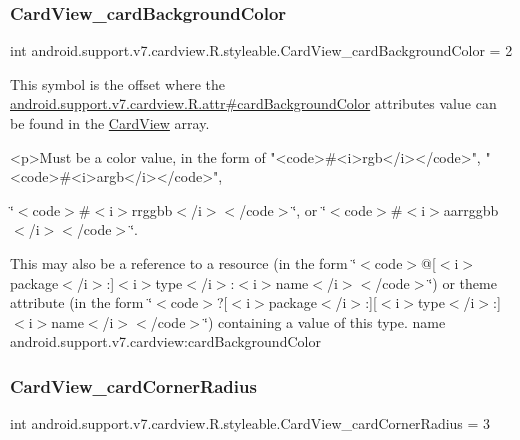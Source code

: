 \subsubsection{\texorpdfstring{Card\+View\+\_\+card\+Background\+Color}{CardView\_cardBackgroundColor}}
{\footnotesize\ttfamily int android.\+support.\+v7.\+cardview.\+R.\+styleable.\+Card\+View\+\_\+card\+Background\+Color = 2\hspace{0.3cm}{\ttfamily [static]}}

This symbol is the offset where the \hyperlink{classandroid_1_1support_1_1v7_1_1cardview_1_1R_1_1attr_ac0ef6047144c1884ba9c7e9d77f6f1ae}{android.\+support.\+v7.\+cardview.\+R.\+attr\#card\+Background\+Color} attribute\textquotesingle{}s value can be found in the \hyperlink{classandroid_1_1support_1_1v7_1_1cardview_1_1R_1_1styleable_ad08b98a07471f174f404c58941fc82ca}{Card\+View} array.

\begin{DoxyVerb}      <p>Must be a color value, in the form of "<code>#<i>rgb</i></code>", "<code>#<i>argb</i></code>",
\end{DoxyVerb}
 \char`\"{}$<$code$>$\#$<$i$>$rrggbb$<$/i$>$$<$/code$>$\char`\"{}, or \char`\"{}$<$code$>$\#$<$i$>$aarrggbb$<$/i$>$$<$/code$>$\char`\"{}. 

This may also be a reference to a resource (in the form \char`\"{}$<$code$>$@\mbox{[}$<$i$>$package$<$/i$>$\+:\mbox{]}$<$i$>$type$<$/i$>$\+:$<$i$>$name$<$/i$>$$<$/code$>$\char`\"{}) or theme attribute (in the form \char`\"{}$<$code$>$?\mbox{[}$<$i$>$package$<$/i$>$\+:\mbox{]}\mbox{[}$<$i$>$type$<$/i$>$\+:\mbox{]}$<$i$>$name$<$/i$>$$<$/code$>$\char`\"{}) containing a value of this type.  name android.\+support.\+v7.\+cardview\+:card\+Background\+Color \mbox{\label{classandroid_1_1support_1_1v7_1_1cardview_1_1R_1_1styleable_aace2dfda6017f1faa65e0083e27d22c2}} 
\subsubsection{\texorpdfstring{Card\+View\+\_\+card\+Corner\+Radius}{CardView\_cardCornerRadius}}
{\footnotesize\ttfamily int android.\+support.\+v7.\+cardview.\+R.\+styleable.\+Card\+View\+\_\+card\+Corner\+Radius = 3\hspace{0.3cm}{\ttfamily [static]}}

